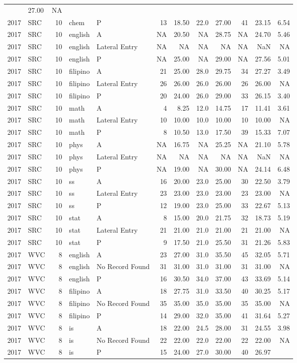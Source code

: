 \documentclass[]{article}
\begin{document}
\begin{longtable}[]{@{}rlrllrrrrrrr@{}}
& 27.00 & NA\tabularnewline
2017 & SRC & 10 & chem & P & 13 & 18.50 & 22.0 & 27.00 & 41 & 23.15 &
6.54\tabularnewline
2017 & SRC & 10 & english & A & NA & 20.50 & NA & 28.75 & NA & 24.70 &
5.46\tabularnewline
2017 & SRC & 10 & english & Lateral Entry & NA & NA & NA & NA & NA & NaN
& NA\tabularnewline
2017 & SRC & 10 & english & P & NA & 25.00 & NA & 29.00 & NA & 27.56 &
5.01\tabularnewline
2017 & SRC & 10 & filipino & A & 21 & 25.00 & 28.0 & 29.75 & 34 & 27.27
& 3.49\tabularnewline
2017 & SRC & 10 & filipino & Lateral Entry & 26 & 26.00 & 26.0 & 26.00 &
26 & 26.00 & NA\tabularnewline
2017 & SRC & 10 & filipino & P & 20 & 24.00 & 26.0 & 29.00 & 33 & 26.15
& 3.40\tabularnewline
2017 & SRC & 10 & math & A & 4 & 8.25 & 12.0 & 14.75 & 17 & 11.41 &
3.61\tabularnewline
2017 & SRC & 10 & math & Lateral Entry & 10 & 10.00 & 10.0 & 10.00 & 10
& 10.00 & NA\tabularnewline
2017 & SRC & 10 & math & P & 8 & 10.50 & 13.0 & 17.50 & 39 & 15.33 &
7.07\tabularnewline
2017 & SRC & 10 & phys & A & NA & 16.75 & NA & 25.25 & NA & 21.10 &
5.78\tabularnewline
2017 & SRC & 10 & phys & Lateral Entry & NA & NA & NA & NA & NA & NaN &
NA\tabularnewline
2017 & SRC & 10 & phys & P & NA & 19.00 & NA & 30.00 & NA & 24.14 &
6.48\tabularnewline
2017 & SRC & 10 & ss & A & 16 & 20.00 & 23.0 & 25.00 & 30 & 22.50 &
3.79\tabularnewline
2017 & SRC & 10 & ss & Lateral Entry & 23 & 23.00 & 23.0 & 23.00 & 23 &
23.00 & NA\tabularnewline
2017 & SRC & 10 & ss & P & 12 & 19.00 & 23.0 & 25.00 & 33 & 22.67 &
5.13\tabularnewline
2017 & SRC & 10 & stat & A & 8 & 15.00 & 20.0 & 21.75 & 32 & 18.73 &
5.19\tabularnewline
2017 & SRC & 10 & stat & Lateral Entry & 21 & 21.00 & 21.0 & 21.00 & 21
& 21.00 & NA\tabularnewline
2017 & SRC & 10 & stat & P & 9 & 17.50 & 21.0 & 25.50 & 31 & 21.26 &
5.83\tabularnewline
2017 & WVC & 8 & english & A & 23 & 27.00 & 31.0 & 35.50 & 45 & 32.05 &
5.71\tabularnewline
2017 & WVC & 8 & english & No Record Found & 31 & 31.00 & 31.0 & 31.00 &
31 & 31.00 & NA\tabularnewline
2017 & WVC & 8 & english & P & 16 & 30.50 & 34.0 & 37.00 & 43 & 33.69 &
5.14\tabularnewline
2017 & WVC & 8 & filipino & A & 18 & 27.75 & 31.0 & 33.50 & 40 & 30.25 &
5.17\tabularnewline
2017 & WVC & 8 & filipino & No Record Found & 35 & 35.00 & 35.0 & 35.00
& 35 & 35.00 & NA\tabularnewline
2017 & WVC & 8 & filipino & P & 14 & 29.00 & 32.0 & 35.00 & 41 & 31.64 &
5.27\tabularnewline
2017 & WVC & 8 & is & A & 18 & 22.00 & 24.5 & 28.00 & 31 & 24.55 &
3.98\tabularnewline
2017 & WVC & 8 & is & No Record Found & 22 & 22.00 & 22.0 & 22.00 & 22 &
22.00 & NA\tabularnewline
2017 & WVC & 8 & is & P & 15 & 24.00 & 27.0 & 30.00 & 40 & 26.97 &

\end{longtable}
\end{document}
